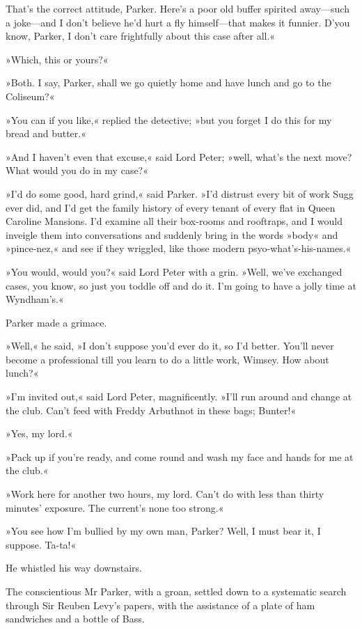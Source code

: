That's the correct attitude, Parker. Here's a poor old buffer spirited away—such a joke—and I don't believe he'd hurt a fly himself—that makes it funnier. D'you know, Parker, I don't care frightfully about this case after all.«

»Which, this or yours?«

»Both. I say, Parker, shall we go quietly home and have lunch and go to the Coliseum?«

»You can if you like,« replied the detective; »but you forget I do this for my bread and butter.«

»And I haven't even that excuse,« said Lord Peter; »well, what's the next move? What would you do in my case?«

»I'd do some good, hard grind,« said Parker. »I'd distrust every bit of work Sugg ever did, and I'd get the family history of every tenant of every flat in Queen Caroline Mansions. I'd examine all their box-rooms and rooftraps, and I would inveigle them into conversations and suddenly bring in the words »body« and »pince-nez,« and see if they wriggled, like those modern psyo-what's-his-names.«

»You would, would you?« said Lord Peter with a grin. »Well, we've exchanged cases, you know, so just you toddle off and do it. I'm going to have a jolly time at Wyndham's.«

Parker made a grimace.

»Well,« he said, »I don't suppose you'd ever do it, so I'd better. You'll never become a professional till you learn to do a little work, Wimsey. How about lunch?«

»I'm invited out,« said Lord Peter, magnificently. »I'll run around and change at the club. Can't feed with Freddy Arbuthnot in these bags; Bunter!«

»Yes, my lord.«

»Pack up if you're ready, and come round and wash my face and hands for me at the club.«

»Work here for another two hours, my lord. Can't do with less than thirty minutes' exposure. The current's none too strong.«

»You see how I'm bullied by my own man, Parker? Well, I must bear it, I suppose. Ta-ta!«

He whistled his way downstairs.

The conscientious Mr Parker, with a groan, settled down to a systematic search through Sir Reuben Levy's papers, with the assistance of a plate of ham sandwiches and a bottle of Bass.

